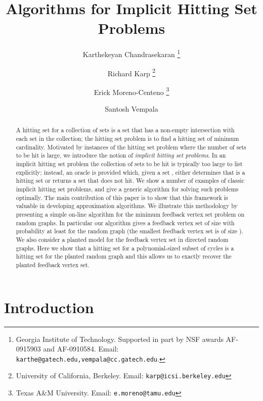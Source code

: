 \documentclass[11pt]{article}
\begin{document}
\title{\Large Algorithms for Implicit Hitting Set Problems}
\author{Karthekeyan Chandrasekaran \thanks{Georgia Institute of Technology. Supported in part by NSF awards AF-0915903 and AF-0910584. Email: {\tt karthe@gatech.edu,vempala@cc.gatech.edu}. }\\
\and Richard Karp \thanks{University of California, Berkeley. Email: {\tt karp@icsi.berkeley.edu}}\\
\and Erick Moreno-Centeno \thanks{Texas A\&M University. Email: {\tt e.moreno@tamu.edu}}\\
\and Santosh Vempala \footnotemark[1]}
\date{}

\maketitle

\begin{abstract}
A hitting set for a collection of sets is a set that has a non-empty intersection with each set in the collection; the hitting set problem is to find a hitting set of minimum cardinality. Motivated by instances of the hitting set problem where the number of sets to be hit is large, we introduce the notion of \emph{implicit hitting set problems}. In an implicit hitting set problem the collection of sets to be hit is typically too large to list explicitly; instead, an oracle
is provided which, given a set , either determines that  is a hitting set or returns a set that  does not hit. We show a number of examples of classic implicit hitting set problems, and give a generic algorithm for solving such problems optimally. The main contribution of this paper is to show that this framework is valuable in developing approximation algorithms. We illustrate this methodology by presenting a simple on-line algorithm for the minimum feedback vertex set problem on random graphs. In particular our algorithm gives a feedback vertex set of size  with probability at least  for the random graph  (the smallest feedback vertex set is of size ). We also consider a planted model for the feedback vertex set in directed random graphs. Here we show that a hitting set for a polynomial-sized subset of cycles is a hitting set for the planted random graph and this allows us to exactly recover the planted feedback vertex set.
\end{abstract}

\section{Introduction}
\end{document}

